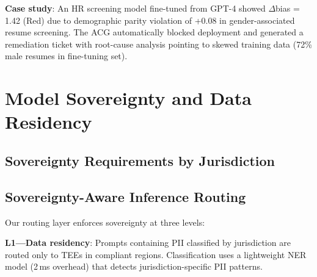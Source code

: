 \documentclass[conference,10pt]{IEEEtran}
\begin{document}
\textbf{Case study}: An HR screening model fine-tuned from GPT-4 showed $\Delta$bias = 1.42 (Red) due to demographic parity violation of +0.08 in gender-associated resume screening. The ACG automatically blocked deployment and generated a remediation ticket with root-cause analysis pointing to skewed training data (72\% male resumes in fine-tuning set).

\section{Model Sovereignty and Data Residency}
\label{sec:sovereignty}

\subsection{Sovereignty Requirements by Jurisdiction}

\begin{table}[!htbp]
\caption{Regulatory Sovereignty Requirements}
\label{tab:sovereignty}
\centering\scriptsize
{}
\end{table}

\subsection{Sovereignty-Aware Inference Routing}

Our routing layer enforces sovereignty at three levels:

\textbf{L1---Data residency}: Prompts containing PII classified by jurisdiction are routed only to TEEs in compliant regions. Classification uses a lightweight NER model (2\,ms overhead) that detects jurisdiction-specific PII patterns.
\end{document}
